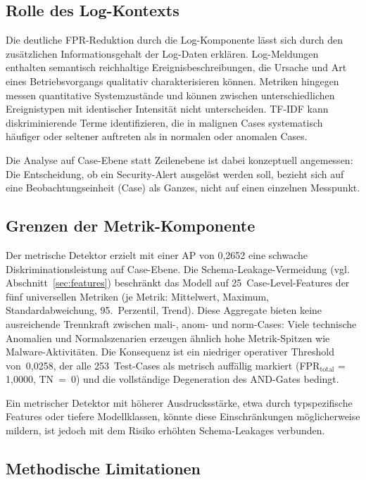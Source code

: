 \subsection{Rolle des Log-Kontexts}

Die deutliche FPR-Reduktion durch die Log-Komponente lässt sich durch den
zusätzlichen Informationsgehalt der Log-Daten erklären. Log-Meldungen enthalten
semantisch reichhaltige Ereignisbeschreibungen, die Ursache und Art eines
Betriebsvorgangs qualitativ charakterisieren können. Metriken hingegen messen quantitative Systemzustände und können zwischen unterschiedlichen Ereignistypen mit identischer Intensität nicht unterscheiden. TF-IDF kann diskriminierende Terme identifizieren, die in malignen Cases systematisch häufiger oder seltener auftreten als in normalen oder anomalen Cases.

Die Analyse auf Case-Ebene statt Zeilenebene ist dabei konzeptuell angemessen: Die Entscheidung, ob ein Security-Alert ausgelöst werden soll, bezieht sich auf eine Beobachtungseinheit (Case) als Ganzes, nicht auf einen einzelnen Messpunkt.

\subsection{Grenzen der Metrik-Komponente}
\label{sec:limits_metric}

Der metrische Detektor erzielt mit einer AP von 0{,}2652 eine schwache Diskriminationsleistung auf Case-Ebene. Die Schema-Leakage-Vermeidung (vgl. Abschnitt~\ref{sec:features}) beschränkt das Modell auf 25~Case-Level-Features der fünf universellen Metriken (je Metrik: Mittelwert, Maximum, Standardabweichung, 95.~Perzentil, Trend). Diese Aggregate bieten keine ausreichende Trennkraft zwischen mali-, anom- und norm-Cases: Viele technische Anomalien und Normalszenarien erzeugen ähnlich hohe Metrik-Spitzen wie Malware-Aktivitäten. Die Konsequenz ist ein niedriger operativer Threshold von~0{,}0258, der alle 253~Test-Cases als metrisch auffällig markiert (FPR$_{\text{total}}$ = 1{,}0000, TN~=~0) und die vollständige Degeneration des AND-Gates bedingt.

Ein metrischer Detektor mit höherer Ausdrucksstärke, etwa durch typspezifische Features oder tiefere Modellklassen, könnte diese Einschränkungen möglicherweise mildern, ist jedoch mit dem Risiko erhöhten Schema-Leakages verbunden.

\subsection{Methodische Limitationen}
\label{sec:limit}

